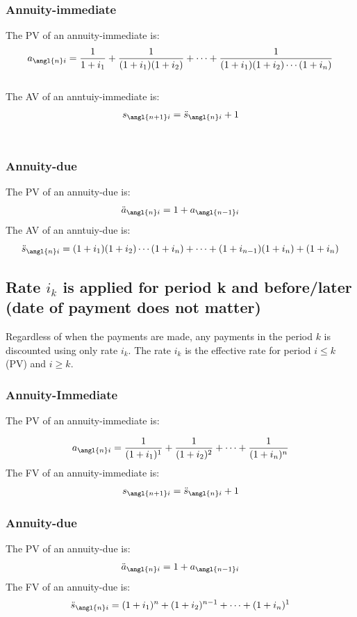 \subsubsection{Annuity-immediate}
\begin{comments}

    The PV of an annuity-immediate is: 
    \[ a_{\angl{n}i} = \frac{1}{1 + i_1} + \frac{1}{(1 + i_1)(1 + i_2)} + \cdots + \frac{1}{(1 + i_1)(1 + i_2) \cdots (1 + i_n)} \] \\
    The AV of an anntuiy-immediate is:
    \[ s_{\angl{n+1}i} = \ddot{s}_{\angl{n}i} + 1 \] \\
\end{comments}


\subsubsection{Annuity-due}
\begin{comments}
    The PV of an annuity-due is:
    \[ \ddot{a}_{\angl{n}i} = 1 + a_{\angl{n-1}i} \] 
    The AV of an anntuiy-due is: 
    \[ \ddot{s}_{\angl{n}i} = (1 + i_1)(1 + i_2)\cdots(1 + i_n) + \cdots + (1 + i_{n-1})(1 + i_n) + (1 + i_n) \]
\end{comments}


\subsection{Rate $i_k$ is applied for period k and before/later (date of payment does not matter)}

\begin{comments}
    Regardless of when the payments are made, any payments in the period $k$ is discounted using only rate $i_k$. 
    The rate $i_k$ is the effective rate for period $i\leq k$ (PV) and $i\ge k$. 
\end{comments}


\subsubsection{Annuity-Immediate}
The PV of an annuity-immediate is:  

\[ a_{\angl{n}i} = \frac{1}{(1 + i_1)^1} + \frac{1}{(1 + i_2)^2} + \cdots + \frac{1}{(1 + i_n)^n}\]
The FV of an annuity-immediate is:  
\[s_{\angl{n+1}i} = \ddot{s}_{\angl{n}i} + 1 \]

\subsubsection{Annuity-due}
The PV of an annuity-due is:
\[\ddot{a}_{\angl{n}i} = 1 + a_{\angl{n-1}i}\]
The FV of an annuity-due is:
\[\ddot{s}_{\angl{n}i} = (1 + i_1)^n + (1 + i_2)^{n-1} + \cdots + (1 + i_n)^1\]




